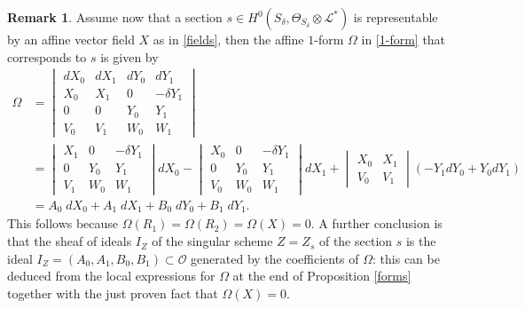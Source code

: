 \documentclass{amsart} %
\theoremstyle{definition}
\newtheorem{remark}[theorem]{Remark}
\newcommand{\cts}{\Theta_{S_{\delta}}}
\newcommand{\mcL}{\mathcal{L}}
\newcommand{\mcO}{\mathcal{O}}
\begin{document}
\begin{remark}
Assume now that a section $ s \in H^{0}( S_{\delta}, \cts \otimes \mcL^{*}) $ is representable by an affine vector
field $ X $ as in \eqref{fields}, then the affine $1$-form $\Omega$  in \eqref{1-form} that corresponds
to $ s $ is given by
\begin{equation}\label{BigOmega}
\begin{aligned}
\Omega  & =
 \begin{vmatrix}
  dX_0 & dX_1 & dY_0 & dY_1\\
  X_0 & X_1 & 0 & -\delta Y_1\\
  0 & 0 & Y_0 & Y_1\\
  V_0 & V_1 & W_0 & W_1
 \end{vmatrix} \\
        & =
  \begin{vmatrix}
  X_1 & 0 & -\delta Y_1\\
  0 & Y_0 & Y_1\\
  V_1 & W_0 & W_1
  \end{vmatrix} dX_0 -
   \begin{vmatrix}
    X_0 & 0 & -\delta Y_1\\
      0 & Y_0 & Y_1\\
    V_0 & W_0 & W_1
    \end{vmatrix} dX_1 +
      \begin{vmatrix}
        X_0 & X_1 \\
        V_0 & V_1
      \end{vmatrix} (-Y_1 dY_0 + Y_0 dY_1)\\
        & =  A_0\;dX_0+A_1\; dX_1+B_0\; dY_0+ B_1\;dY_1.
    \end{aligned}
\end{equation}
 This follows because $ \Omega( R_1 ) = \Omega( R_2 ) = \Omega( X ) = 0 $.
 A further conclusion is that the sheaf of ideals $ I_Z $ of the singular
 scheme $ Z = Z_s $ of the section $ s $ is the ideal $ I_Z = (A_0, A_1, B_0, B_1) \subset \mcO $
 generated by the coefficients of $ \Omega $: this can be deduced from the local expressions for
 $ \Omega $ at the end of Proposition \ref{forms} together with the just proven fact that
 $ \Omega( X ) = 0 $.
 \end{remark}
\end{document}
